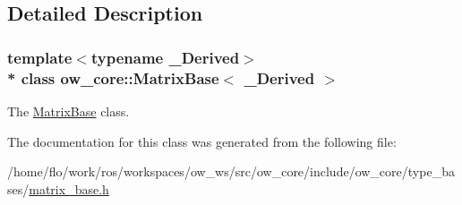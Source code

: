 \subsection{Detailed Description}
\subsubsection*{template$<$typename \+\_\+\+Derived$>$\\*
class ow\+\_\+core\+::\+Matrix\+Base$<$ \+\_\+\+Derived $>$}

The \hyperlink{classow__core_1_1MatrixBase}{Matrix\+Base} class. 

The documentation for this class was generated from the following file\+:\begin{DoxyCompactItemize}
\item 
/home/flo/work/ros/workspaces/ow\+\_\+ws/src/ow\+\_\+core/include/ow\+\_\+core/type\+\_\+bases/\hyperlink{matrix__base_8h}{matrix\+\_\+base.\+h}\end{DoxyCompactItemize}

